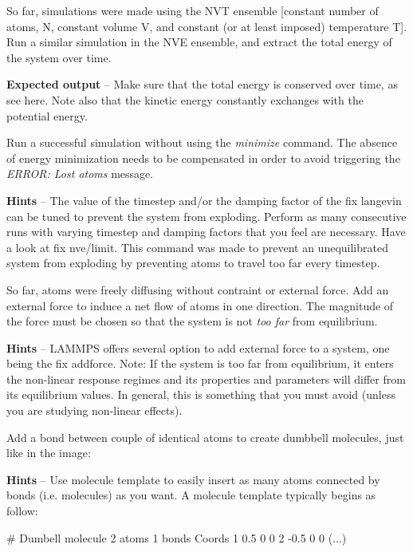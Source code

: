 So far, simulations were made using the NVT ensemble [constant number 
of atoms, N, constant volume V, and constant (or at least imposed)
temperature T].
Run a similar simulation in the NVE ensemble, and extract the
total energy of the system over time.

\noindent \textbf{Expected output} -- Make sure that the total energy is conserved over time, as see here. Note also 
that the kinetic energy constantly exchanges with the potential energy.

Run a successful simulation without using the \textit{minimize} command.
The absence of energy minimization needs to be compensated
in order to avoid triggering the \textit{ERROR: Lost atoms} message.

\noindent \textbf{Hints} -- The value of the timestep and/or the damping factor of the fix langevin
can be tuned to prevent the system from exploding.
Perform as many consecutive runs with varying timestep and damping
factors that you feel are necessary.
Have a look at fix nve/limit. This command was
made to prevent an unequilibrated system from exploding
by preventing atoms to travel too far every timestep.

So far, atoms were freely diffusing without contraint or external force.
Add an external force to induce a net flow of atoms in one
direction. The magnitude of the force must be chosen so
that the system is not \textit{too far} from equilibrium.

\noindent \textbf{Hints} -- LAMMPS offers several option to add external force to a system, one 
being the fix addforce.
Note: If the system is too far from equilibrium, it enters the non-linear response 
regimes and its properties and parameters will differ from its equilibrium values.
In general, this is something that you must avoid (unless you are studying
non-linear effects). 

Add a bond between couple of identical atoms to create
dumbbell molecules, just like in the image:

\noindent \textbf{Hints} -- Use molecule template to easily insert as many atoms connected
by bonds (i.e. molecules) as you want. A molecule 
template typically begins as follow:
\begin{lcverbatim}
# Dumbell molecule
2 atoms
1 bonds
Coords
1 0.5 0 0
2 -0.5 0 0
(...)
\end{lcverbatim}

